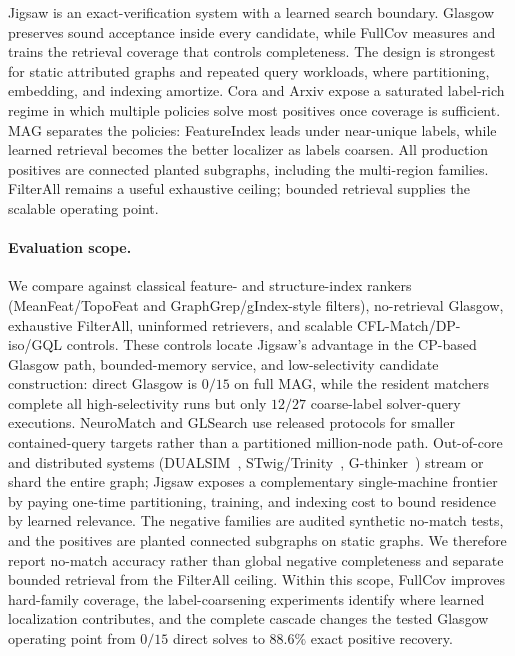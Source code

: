 \documentclass[runningheads]{llncs}
\begin{document}
Jigsaw is an exact-verification system with a learned search boundary. Glasgow preserves sound acceptance inside every candidate, while FullCov measures and trains the retrieval coverage that controls completeness. The design is strongest for static attributed graphs and repeated query workloads, where partitioning, embedding, and indexing amortize. Cora and Arxiv expose a saturated label-rich regime in which multiple policies solve most positives once coverage is sufficient. MAG separates the policies: FeatureIndex leads under near-unique labels, while learned retrieval becomes the better localizer as labels coarsen. All production positives are connected planted subgraphs, including the multi-region families. FilterAll remains a useful exhaustive ceiling; bounded retrieval supplies the scalable operating point.

\paragraph{Evaluation scope.} We compare against classical feature- and structure-index rankers (MeanFeat/TopoFeat and GraphGrep/gIndex-style filters), no-retrieval Glasgow, exhaustive FilterAll, uninformed retrievers, and scalable CFL-Match/DP-iso/GQL controls. These controls locate Jigsaw's advantage in the CP-based Glasgow path, bounded-memory service, and low-selectivity candidate construction: direct Glasgow is $0/15$ on full MAG, while the resident matchers complete all high-selectivity runs but only $12/27$ coarse-label solver-query executions. NeuroMatch and GLSearch use released protocols for smaller contained-query targets rather than a partitioned million-node path. Out-of-core and distributed systems (DUALSIM~\cite{ref_dualsim}, STwig/Trinity~\cite{ref_trinity}, G-thinker~\cite{ref_gthinker}) stream or shard the entire graph; Jigsaw exposes a complementary single-machine frontier by paying one-time partitioning, training, and indexing cost to bound residence by learned relevance. The negative families are audited synthetic no-match tests, and the positives are planted connected subgraphs on static graphs. We therefore report no-match accuracy rather than global negative completeness and separate bounded retrieval from the FilterAll ceiling. Within this scope, FullCov improves hard-family coverage, the label-coarsening experiments identify where learned localization contributes, and the complete cascade changes the tested Glasgow operating point from $0/15$ direct solves to $88.6\%$ exact positive recovery.
\end{document}
